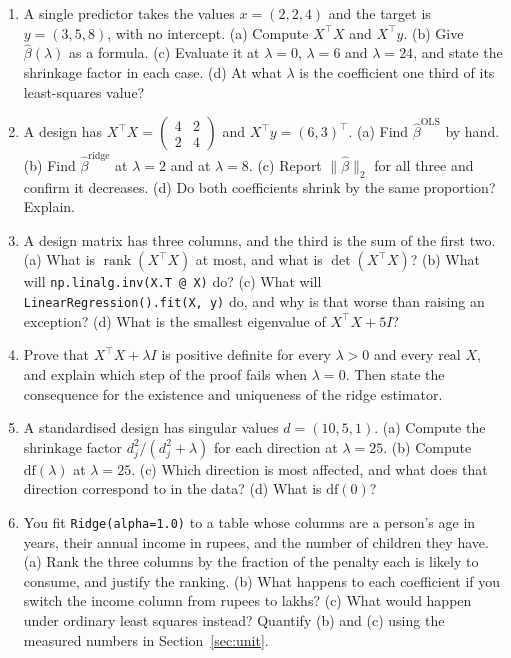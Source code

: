 \documentclass[11pt]{article}
\newcommand{\bhat}{\hat\beta}
\newcommand{\XtX}{X^{\!\top}\!X}
\newcommand{\Xty}{X^{\!\top}y}
\begin{document}
\begin{enumerate}[leftmargin=*]
  \item\label{q:hand1} A single predictor takes the values
    $x = (2, 2, 4)$ and the target is $y = (3, 5, 8)$, with no intercept.
    (a) Compute $\XtX$ and $\Xty$. (b) Give $\bhat(\lambda)$ as a formula.
    (c) Evaluate it at $\lambda = 0$, $\lambda = 6$ and $\lambda = 24$, and
    state the shrinkage factor in each case. (d) At what $\lambda$ is the
    coefficient one third of its least-squares value?

  \item\label{q:hand2} A design has
    $\XtX = \left(\begin{smallmatrix}4&2\\2&4\end{smallmatrix}\right)$ and
    $\Xty = (6, 3)^{\!\top}$. (a) Find $\bhat^{\mathrm{OLS}}$ by hand.
    (b) Find $\bhat^{\mathrm{ridge}}$ at $\lambda = 2$ and at $\lambda = 8$.
    (c) Report $\|\bhat\|_2$ for all three and confirm it decreases.
    (d) Do both coefficients shrink by the same proportion? Explain.

  \item\label{q:sing} A design matrix has three columns, and the third is the
    sum of the first two. (a) What is $\operatorname{rank}(\XtX)$ at most, and
    what is $\det(\XtX)$? (b) What will \texttt{np.linalg.inv(X.T @ X)} do?
    (c) What will \texttt{LinearRegression().fit(X, y)} do, and why is that
    worse than raising an exception? (d) What is the smallest eigenvalue of
    $\XtX + 5I$?

  \item\label{q:proof} Prove that $\XtX + \lambda I$ is positive definite for
    every $\lambda > 0$ and every real $X$, and explain which step of the
    proof fails when $\lambda = 0$. Then state the consequence for the
    existence and uniqueness of the ridge estimator.

  \item\label{q:svd} A standardised design has singular values
    $d = (10, 5, 1)$. (a) Compute the shrinkage factor
    $d_j^2/(d_j^2+\lambda)$ for each direction at $\lambda = 25$.
    (b) Compute $\mathrm{df}(\lambda)$ at $\lambda = 25$. (c) Which direction
    is most affected, and what does that direction correspond to in the data?
    (d) What is $\mathrm{df}(0)$?

  \item\label{q:scale} You fit \texttt{Ridge(alpha=1.0)} to a table whose
    columns are a person's age in years, their annual income in rupees, and
    the number of children they have. (a) Rank the three columns by the
    fraction of the penalty each is likely to consume, and justify the
    ranking. (b) What happens to each coefficient if you switch the income
    column from rupees to lakhs? (c) What would happen under ordinary least
    squares instead? Quantify (b) and (c) using the measured numbers in
    Section~\ref{sec:unit}.


\end{enumerate}
\end{document}
